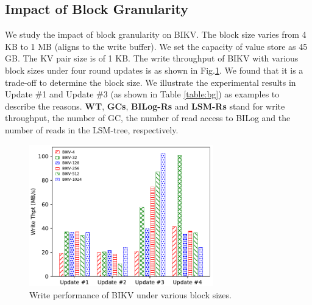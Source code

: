 \documentclass[sigconf]{acmart}
\begin{document}
\subsection{Impact of Block Granularity}
We study the impact of block granularity on BIKV. The block size varies from 4 KB to 1 MB (aligns to the write buffer). We set the capacity of value store as 45 GB. The KV pair size is of 1 KB. The write throughput of BIKV with various block sizes under four round updates is as shown in Fig.\ref{fig:bg}. We found that it is a trade-off to determine the block size. We illustrate the experimental results in Update \#1 and Update \#3 (as shown in Table \ref{table:bg}) as examples to describe the reasons. \textbf{WT}, \textbf{GCs}, \textbf{BILog-Rs} and \textbf{LSM-Rs} stand for write throughput, the number of GC, the number of read access to BILog and the number of reads in the LSM-tree, respectively.

\begin{figure}[t]
	\setlength{\abovecaptionskip}{0.cm}	
	\setlength{\belowcaptionskip}{-0.cm}
	\centering
	\includegraphics[width=80mm]{block_gra.pdf}
	\makeatletter\def\@captype{figure}\makeatother\caption{Write performance of BIKV under various block sizes.} 
	\label{fig:bg}			
\end{figure}
\end{document}
